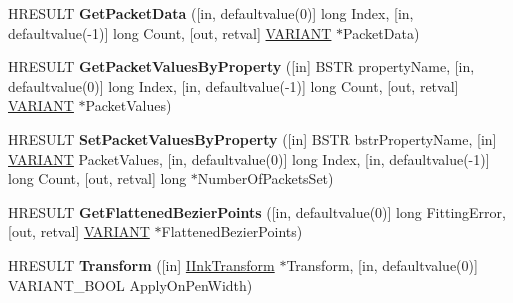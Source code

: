\begin{DoxyCompactItemize}
H\+R\+E\+S\+U\+LT {\bfseries Get\+Packet\+Data} (\mbox{[}in, defaultvalue(0)\mbox{]} long Index, \mbox{[}in, defaultvalue(-\/1)\mbox{]} long Count, \mbox{[}out, retval\mbox{]} \hyperlink{structtag_v_a_r_i_a_n_t}{V\+A\+R\+I\+A\+NT} $\ast$Packet\+Data)
\item 
\mbox{\label{interface_m_s_i_n_k_a_u_t_lib_1_1_i_ink_stroke_disp_a0f18ede50503005d9777b77e27f07b5f}} 
H\+R\+E\+S\+U\+LT {\bfseries Get\+Packet\+Values\+By\+Property} (\mbox{[}in\mbox{]} B\+S\+TR property\+Name, \mbox{[}in, defaultvalue(0)\mbox{]} long Index, \mbox{[}in, defaultvalue(-\/1)\mbox{]} long Count, \mbox{[}out, retval\mbox{]} \hyperlink{structtag_v_a_r_i_a_n_t}{V\+A\+R\+I\+A\+NT} $\ast$Packet\+Values)
\item 
\mbox{\label{interface_m_s_i_n_k_a_u_t_lib_1_1_i_ink_stroke_disp_afad4b4742a2d63fa36a2c3ef9e201e9c}} 
H\+R\+E\+S\+U\+LT {\bfseries Set\+Packet\+Values\+By\+Property} (\mbox{[}in\mbox{]} B\+S\+TR bstr\+Property\+Name, \mbox{[}in\mbox{]} \hyperlink{structtag_v_a_r_i_a_n_t}{V\+A\+R\+I\+A\+NT} Packet\+Values, \mbox{[}in, defaultvalue(0)\mbox{]} long Index, \mbox{[}in, defaultvalue(-\/1)\mbox{]} long Count, \mbox{[}out, retval\mbox{]} long $\ast$Number\+Of\+Packets\+Set)
\item 
\mbox{\label{interface_m_s_i_n_k_a_u_t_lib_1_1_i_ink_stroke_disp_ac2b0721c3906496cfeef233a0edaa038}} 
H\+R\+E\+S\+U\+LT {\bfseries Get\+Flattened\+Bezier\+Points} (\mbox{[}in, defaultvalue(0)\mbox{]} long Fitting\+Error, \mbox{[}out, retval\mbox{]} \hyperlink{structtag_v_a_r_i_a_n_t}{V\+A\+R\+I\+A\+NT} $\ast$Flattened\+Bezier\+Points)
\item 
\mbox{\label{interface_m_s_i_n_k_a_u_t_lib_1_1_i_ink_stroke_disp_acd0e429cd1d5aa01fee635c523110ab6}} 
H\+R\+E\+S\+U\+LT {\bfseries Transform} (\mbox{[}in\mbox{]} \hyperlink{interface_m_s_i_n_k_a_u_t_lib_1_1_i_ink_transform}{I\+Ink\+Transform} $\ast$Transform, \mbox{[}in, defaultvalue(0)\mbox{]} V\+A\+R\+I\+A\+N\+T\+\_\+\+B\+O\+OL Apply\+On\+Pen\+Width)
\item 
\mbox{\label{interface_m_s_i_n_k_a_u_t_lib_1_1_i_ink_stroke_disp_ab08c386a7ebe5d4d642270038b9969d9}} 

\end{DoxyCompactItemize}
